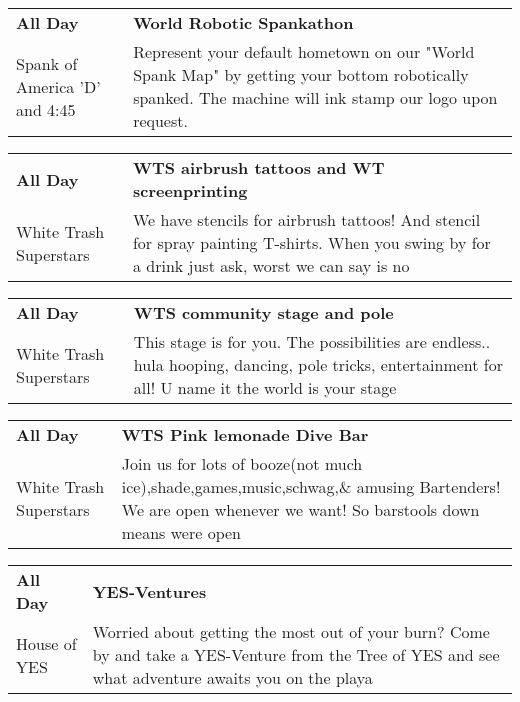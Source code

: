 \begin{tabular}{ p{1in} p{2.2in} }
    \textbf{All Day} & \textbf{World Robotic Spankathon} \\
    Spank of America \newline 'D' and 4:45 & Represent your default hometown on our "World Spank Map" by getting your bottom robotically spanked. The machine will ink stamp our logo upon request. \\
    \hline 
\end{tabular}
    
\begin{tabular}{ p{1in} p{2.2in} }
    \textbf{All Day} & \textbf{WTS airbrush tattoos and WT screenprinting} \\
    White Trash Superstars \newline  & We have stencils for airbrush tattoos! And stencil for spray painting T-shirts. When you swing by for a drink just ask, worst we can say is no \\
    \hline 
\end{tabular}
    
\begin{tabular}{ p{1in} p{2.2in} }
    \textbf{All Day} & \textbf{WTS community stage and pole} \\
    White Trash Superstars \newline  & This stage is for you. The possibilities are endless.. hula hooping,  dancing, pole tricks, entertainment for all! U name it the world is your stage \\
    \hline 
\end{tabular}
    
\begin{tabular}{ p{1in} p{2.2in} }
    \textbf{All Day} & \textbf{WTS Pink lemonade Dive Bar} \\
    White Trash Superstars \newline  & Join us for lots of booze(not much ice),shade,games,music,schwag,\& amusing Bartenders! We are open whenever we want! So barstools down means were open \\
    \hline 
\end{tabular}
    
\begin{tabular}{ p{1in} p{2.2in} }
    \textbf{All Day} & \textbf{YES-Ventures} \\
    House of YES \newline  & Worried about getting the most out of your burn? Come by and take a YES-Venture from the Tree of YES and see what adventure awaits you on the playa \\
    \hline 
\end{tabular}
    
